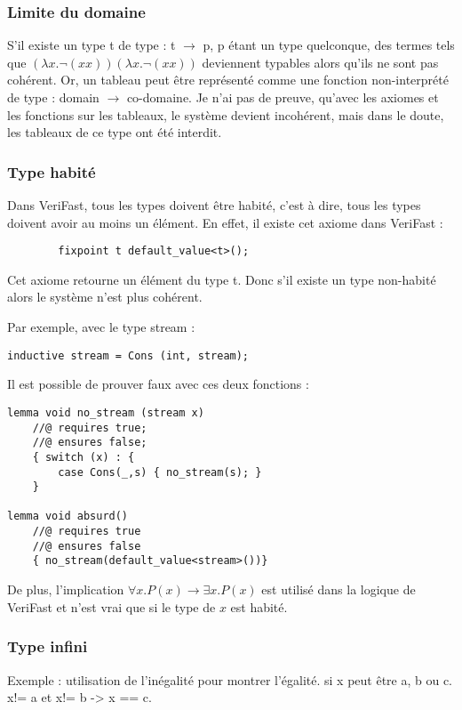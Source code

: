 \documentclass[9pt,openany]{book}
\newcommand{\verifast}{VeriFast}
\begin{document}
			\subsubsection{Limite du domaine}
			S'il existe un type t de type : t $\rightarrow$ p, p \'etant un type quelconque, des termes tels que $(\lambda x. \neg(xx))(\lambda x.\neg(xx))$ 	deviennent typables alors qu'ils ne sont pas coh\'erent. Or, un tableau peut \^etre repr\'esent\'e comme une fonction non-interpr\'et\'e de type : domain $\rightarrow$ co-domaine. Je n'ai pas de preuve, qu'avec les axiomes et les fonctions sur les tableaux, le syst\`eme devient incoh\'erent, mais dans le doute, les tableaux de ce type ont \'et\'e interdit.
			\subsubsection{Type habit\'e}
				Dans \verifast{}, tous les types doivent \^etre habit\'e, c'est \`a dire, tous les types doivent avoir au moins un \'el\'ement. En effet, il existe cet axiome dans \verifast{} :
		\begin{lstlisting}
		fixpoint t default_value<t>();
		\end{lstlisting}
		Cet axiome retourne un \'el\'ement du type t. Donc s'il existe un type non-habit\'e alors le syst\`eme n'est plus coh\'erent. \par
		Par exemple, avec le type stream :
\begin{lstlisting}
inductive stream = Cons (int, stream);
\end{lstlisting}
Il est possible de prouver faux avec ces deux fonctions :
\begin{lstlisting}
lemma void no_stream (stream x)
	//@ requires true;
	//@ ensures false;
	{ switch (x) : {
		case Cons(_,s) { no_stream(s); }
	}

lemma void absurd()
	//@ requires true
	//@ ensures false
	{ no_stream(default_value<stream>())}

		\end{lstlisting}
\par De plus, l'implication
				$\forall x. P(x) \rightarrow \exists x. P(x)$ est utilis\'e dans la logique de \verifast{} et n'est vrai que si le type de $x$ est habit\'e.
			\subsubsection{Type infini}
				Exemple : utilisation de l'in\'egalit\'e pour montrer l'\'egalit\'e. si x peut \^etre a, b ou c. x!= a et x!= b -> x == c.
\end{document}
